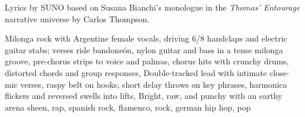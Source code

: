
\begin{notes}
Lyrics by SUNO based on Susana Bianchi's monologue in the \emph{Thomas’ Entourage} narrative universe by Carlos Thompson.
\end{notes}
\begin{style}
Milonga rock with Argentine female vocals, driving 6/8 handclaps and electric guitar stabs; verses ride bandoneón, nylon guitar and bass in a tense milonga groove, pre-chorus strips to voice and palmas, chorus hits with crunchy drums, distorted chords and group responses, Double-tracked lead with intimate close-mic verses, raspy belt on hooks, short delay throws on key phrases, harmonica flickers and reversed swells into lifts, Bright, raw, and punchy with an earthy arena sheen, rap, spanish rock, flamenco, rock, german hip hop, pop
\end{style}
